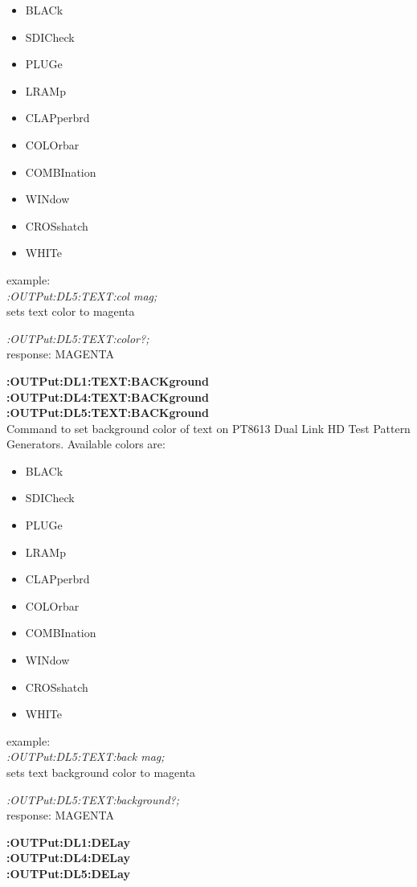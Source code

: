 \begin{itemize}
\item BLACk
\item SDICheck
\item PLUGe
\item LRAMp
\item CLAPperbrd
\item COLOrbar
\item COMBInation
\item WINdow
\item CROSshatch
\item WHITe
\end{itemize}

example:\\
\textit{:OUTPut:DL5:TEXT:col mag;}\\
sets text color to magenta

\textit{:OUTPut:DL5:TEXT:color?;}\\     
response: MAGENTA

\textbf{:OUTPut:DL1:TEXT:BACKground}\\
\textbf{:OUTPut:DL4:TEXT:BACKground}\\
\textbf{:OUTPut:DL5:TEXT:BACKground}\\

Command to set background color of text on PT8613 Dual Link HD Test Pattern Generators. Available colors are:

\begin{itemize}
\item BLACk
\item SDICheck
\item PLUGe
\item LRAMp
\item CLAPperbrd
\item COLOrbar
\item COMBInation
\item WINdow
\item CROSshatch
\item WHITe
\end{itemize}

example:\\
\textit{:OUTPut:DL5:TEXT:back mag;}\\    
sets text background color to magenta

\textit{:OUTPut:DL5:TEXT:background?;}\\ 
response: MAGENTA

\textbf{:OUTPut:DL1:DELay}\\
\textbf{:OUTPut:DL4:DELay}\\
\textbf{:OUTPut:DL5:DELay}\\

